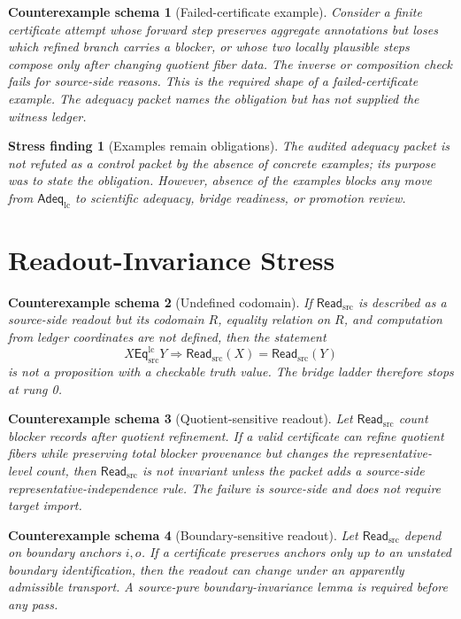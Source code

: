 \documentclass[11pt]{article}
\newcommand{\EqLC}{\mathsf{Eq}_{\mathrm{src}}^{\mathrm{lc}}}
\newcommand{\ReadSrc}{\mathsf{Read}_{\mathrm{src}}}
\newcommand{\AdeqLC}{\mathsf{Adeq}_{\mathrm{lc}}}
\newtheorem{stressfinding}{Stress finding}
\newtheorem{counterexample}{Counterexample schema}
\begin{document}
\begin{counterexample}[Failed-certificate example]
Consider a finite certificate attempt whose forward step preserves
aggregate annotations but loses which refined branch carries a blocker,
or whose two locally plausible steps compose only after changing
quotient fiber data. The inverse or composition check fails for
source-side reasons. This is the required shape of a failed-certificate
example. The adequacy packet names the obligation but has not supplied
the witness ledger.
\end{counterexample}

\begin{stressfinding}[Examples remain obligations]
The audited adequacy packet is not refuted as a control packet by the
absence of concrete examples; its purpose was to state the obligation.
However, absence of the examples blocks any move from \(\AdeqLC\) to
scientific adequacy, bridge readiness, or promotion review.
\end{stressfinding}

\section{Readout-Invariance Stress}

\begin{counterexample}[Undefined codomain]
If \(\ReadSrc\) is described as a source-side readout but its codomain
\(R\), equality relation on \(R\), and computation from ledger
coordinates are not defined, then the statement
\[
    X\EqLC Y \Longrightarrow \ReadSrc(X)=\ReadSrc(Y)
\]
is not a proposition with a checkable truth value. The bridge ladder
therefore stops at rung 0.
\end{counterexample}

\begin{counterexample}[Quotient-sensitive readout]
Let \(\ReadSrc\) count blocker records after quotient refinement. If a
valid certificate can refine quotient fibers while preserving total
blocker provenance but changes the representative-level count, then
\(\ReadSrc\) is not invariant unless the packet adds a source-side
representative-independence rule. The failure is source-side and does
not require target import.
\end{counterexample}

\begin{counterexample}[Boundary-sensitive readout]
Let \(\ReadSrc\) depend on boundary anchors \(i,o\). If a certificate
preserves anchors only up to an unstated boundary identification, then
the readout can change under an apparently admissible transport. A
source-pure boundary-invariance lemma is required before any pass.
\end{counterexample}
\end{document}
